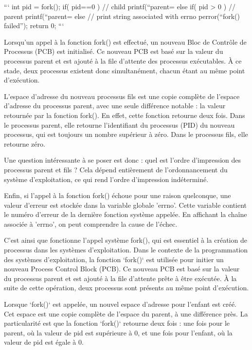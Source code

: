 \documentclass[12pt]{article}
\begin{document}
```
int pid = fork();
if( pid==0 ) {
  // child
  printf(“parent=%
}
else if( pid > 0 ) {
  // parent
  printf(“parent=%
}
else {
  // print string associated with errno
  perror(“fork() failed”);
}
return 0;
```

Lorsqu'un appel à la fonction fork() est effectué, un nouveau Bloc de Contrôle de Processus (PCB) est initialisé. Ce nouveau PCB est basé sur la valeur du processus parent et est ajouté à la file d'attente des processus exécutables. À ce stade, deux processus existent donc simultanément, chacun étant au même point d'exécution.

L'espace d'adresse du nouveau processus fils est une copie complète de l'espace d'adresse du processus parent, avec une seule différence notable : la valeur retournée par la fonction fork(). En effet, cette fonction retourne deux fois. Dans le processus parent, elle retourne l'identifiant du processus (PID) du nouveau processus, qui est toujours un nombre supérieur à zéro. Dans le processus fils, elle retourne zéro.

Une question intéressante à se poser est donc : quel est l'ordre d'impression des processus parent et fils ? Cela dépend entièrement de l'ordonnancement du système d'exploitation, ce qui rend l'ordre d'impression indéterminé.

Enfin, si l'appel à la fonction fork() échoue pour une raison quelconque, une valeur d'erreur est stockée dans la variable globale 'errno'. Cette variable contient le numéro d'erreur de la dernière fonction système appelée. En affichant la chaîne associée à 'errno', on peut comprendre la cause de l'échec.

C'est ainsi que fonctionne l'appel système fork(), qui est essentiel à la création de processus dans les systèmes d'exploitation.
Dans le contexte de la programmation des systèmes d'exploitation, la fonction `fork()` est utilisée pour initier un nouveau Process Control Block (PCB). Ce nouveau PCB est basé sur la valeur du processus parent et est ajouté à la file d'attente prête à être exécutée. À la suite de cette opération, deux processus sont présents au même point d'exécution.

Lorsque `fork()` est appelée, un nouvel espace d'adresse pour l'enfant est créé. Cet espace est une copie complète de l'espace du parent, à une différence près. La particularité est que la fonction `fork()` retourne deux fois : une fois pour le parent, où la valeur de pid est supérieure à 0, et une fois pour l'enfant, où la valeur de pid est égale à 0.
\end{document}
